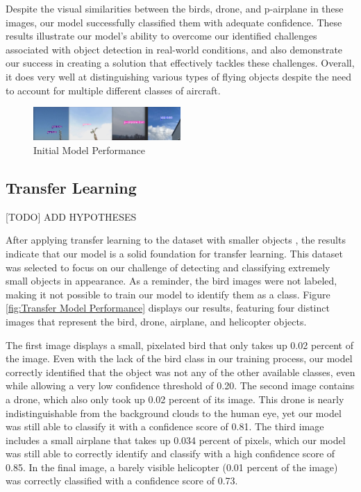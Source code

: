 \documentclass[10pt,twocolumn,letterpaper]{article}
\begin{document}
Despite the visual similarities between the birds, drone, and p-airplane in these images, our model successfully classified them with adequate confidence. These results illustrate our model's ability to overcome our identified challenges associated with object detection in real-world conditions, and also demonstrate our success in creating a solution that effectively tackles these challenges. Overall, it does very well at distinguishing various types of flying objects despite the need to account for multiple different classes of aircraft.

\begin{figure}[h]
    \centering
    \includegraphics[width=0.5\textwidth]{figures/original_model.png}
    \caption{Initial Model Performance \cite{InitialDataset}}
    \label{fig:Initial Model Performance}
\end{figure}

\subsection{Transfer Learning}

[TODO] ADD HYPOTHESES

After applying transfer learning to the dataset with smaller objects \cite{TransferDataset}, the results indicate that our model is a solid foundation for transfer learning. This dataset was selected to focus on our challenge of detecting and classifying extremely small objects in appearance. As a reminder, the bird images were not labeled, making it not possible to train our model to identify them as a class. Figure \ref{fig:Transfer Model Performance} displays our results, featuring four distinct images that represent the bird, drone, airplane, and helicopter objects.

The first image displays a small, pixelated bird that only takes up 0.02 percent of the image. Even with the lack of the bird class in our training process, our model correctly identified that the object was not any of the other available classes, even while allowing a very low confidence threshold of 0.20. The second image contains a drone, which also only took up 0.02 percent of its image. This drone is nearly indistinguishable from the background clouds to the human eye, yet our model was still able to classify it with a confidence score of 0.81. The third image includes a small airplane that takes up 0.034 percent of pixels, which our model was still able to correctly identify and classify with a high confidence score of 0.85. In the final image, a barely visible helicopter (0.01 percent of the image) was correctly classified with a confidence score of 0.73.
\end{document}
